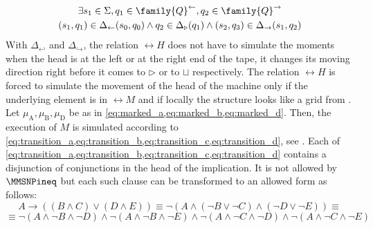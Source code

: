 \documentclass{lmcs}
\begin{document}
\begin{multline}
\exists s_1\in\Sigma,q_1\in\family{Q}^\leftarrow,q_2\in\family{Q}^\rightarrow \\ (s_1,q_1)\in\Delta_\leftarrow(s_0,q_0)\wedge q_2\in\Delta_\triangleright(q_1)\wedge (s_2, q_3)\in\Delta_\rightarrow(s_1,q_2)
\end{multline}
With $\Delta_{\hookleftarrow}$ and $\Delta_{\hookrightarrow}$, the relation $\rel{H}$ does not have to simulate the moments when the head is at the left or at the right end of the tape, it changes its moving direction right before it comes to $\triangleright$ or to $\sqcup$ respectively.
The relation $\rel{H}$ is forced to simulate the movement of the head of the machine only if the underlying element is in $\rel{M}$ and if locally the structure looks like a grid from .
Let $\mu_\mathrm{A},\mu_\mathrm{B},\mu_\mathrm{D}$ be as in \cref{eq:marked_a,eq:marked_b,eq:marked_d}.
Then, the execution of $M$ is simulated according to \cref{eq:transition_a,eq:transition_b,eq:transition_c,eq:transition_d}, see .
Each of \cref{eq:transition_a,eq:transition_b,eq:transition_c,eq:transition_d} contains a disjunction of conjunctions in the head of the implication.
It is not allowed by $\MMSNPineq$ but each such clause can be transformed to an allowed form as follows:
\begin{equation*}
A\rightarrow ((B\wedge C)\vee (D\wedge E))\equiv \neg(A\wedge (\neg B\vee \neg C)\wedge(\neg D\vee\neg E))\equiv
\end{equation*}
\begin{equation*}
\equiv \neg(A\wedge \neg B\wedge \neg D)\wedge\neg(A\wedge \neg B\wedge \neg E)\wedge\neg(A\wedge \neg C\wedge \neg D)\wedge\neg(A\wedge \neg C\wedge \neg E)
\end{equation*}
\end{document}
